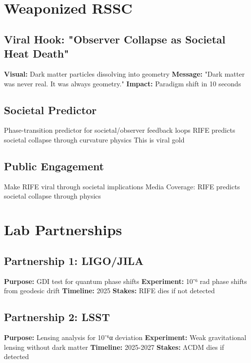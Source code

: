 \documentclass[11pt]{report}
\begin{document}
\section{Weaponized RSSC}

\subsection{Viral Hook: "Observer Collapse as Societal Heat Death"}
\textbf{Visual:} Dark matter particles dissolving into geometry
\textbf{Message:} "Dark matter was never real. It was always geometry."
\textbf{Impact:} Paradigm shift in 10 seconds

\subsection{Societal Predictor}
Phase-transition predictor for societal/observer feedback loops
RIFE predicts societal collapse through curvature physics
This is viral gold

\subsection{Public Engagement}
Make RIFE viral through societal implications
Media Coverage: RIFE predicts societal collapse through physics

\section{Lab Partnerships}

\subsection{Partnership 1: LIGO/JILA}
\textbf{Purpose:} GDI test for quantum phase shifts
\textbf{Experiment:} 10⁻⁶ rad phase shifts from geodesic drift
\textbf{Timeline:} 2025
\textbf{Stakes:} RIFE dies if not detected

\subsection{Partnership 2: LSST}
\textbf{Purpose:} Lensing analysis for 10⁻⁶α deviation
\textbf{Experiment:} Weak gravitational lensing without dark matter
\textbf{Timeline:} 2025-2027
\textbf{Stakes:} ΛCDM dies if detected
\end{document}
